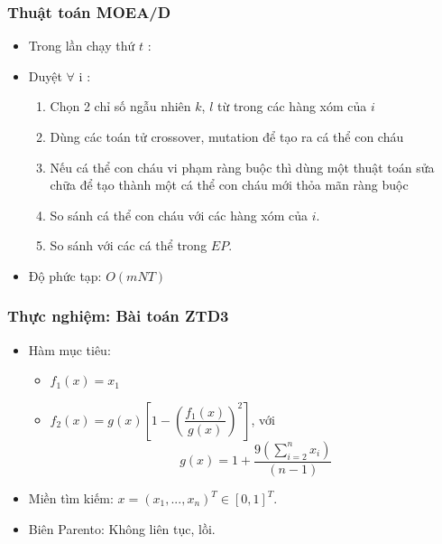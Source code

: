 \documentclass{beamer}
\begin{document}
    \begin{frame}
    \frametitle{\textbf{Thuật toán MOEA/D}} 
        \begin{itemize}
            \item<1-> Trong lần chạy thứ $ t $ :
            \item<2-> Duyệt $ \forall $ i :
            \begin{enumerate}
                \item<2-> Chọn 2 chỉ số ngẫu nhiên $ k $, $ l $ từ trong các hàng xóm của $ i $
                \item<2-> Dùng các toán tử crossover, mutation để tạo ra cá thể con cháu
                \item<2-> Nếu cá thể con cháu vi phạm ràng buộc thì dùng một thuật toán sửa chữa để tạo thành một
                cá thể con cháu mới thỏa mãn ràng buộc
                \item<3-> So sánh cá thể con cháu với các hàng xóm của $ i $. 
                \item<3-> So sánh với các cá thể trong $ EP $.
            \end{enumerate}
            \item<4-> Độ phức tạp: $ O(mNT) $
        \end{itemize}
    \end{frame}


    \begin{frame}
    \frametitle{\textbf{Thực nghiệm: Bài toán ZTD3}}
        \begin{itemize}
            \item Hàm mục tiêu:
            \begin{itemize}
                \item $ f_1(x) = x_1 $
                \item $ f_2(x) = g(x) \left[ 1 - \left( \dfrac{f_1(x)}{g(x)} \right)^2 \right] $, với
                $$ g(x) = 1 +\dfrac{9 \left( \sum\limits_{i = 2}^n x_i \right)}{(n - 1)} $$
            \end{itemize}
            \item Miền tìm kiếm: $ x = (x_1, ..., x_n)^T \in \left[0, 1\right]^T $.
            \item Biên Parento: Không liên tục, lồi.
        \end{itemize}
    \end{frame}
\end{document}
